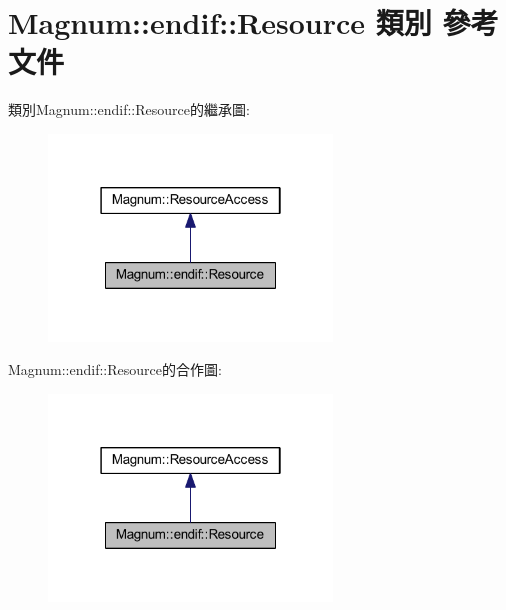 \hypertarget{class_magnum_1_1endif_1_1_resource}{}\section{Magnum\+:\+:endif\+:\+:Resource 類別 參考文件}
\label{class_magnum_1_1endif_1_1_resource}


類別\+Magnum\+:\+:endif\+:\+:Resource的繼承圖\+:\nopagebreak
\begin{figure}[H]
\begin{center}
\leavevmode
\includegraphics[width=214pt]{class_magnum_1_1endif_1_1_resource__inherit__graph}
\end{center}
\end{figure}


Magnum\+:\+:endif\+:\+:Resource的合作圖\+:\nopagebreak
\begin{figure}[H]
\begin{center}
\leavevmode
\includegraphics[width=214pt]{class_magnum_1_1endif_1_1_resource__coll__graph}
\end{center}
\end{figure}
